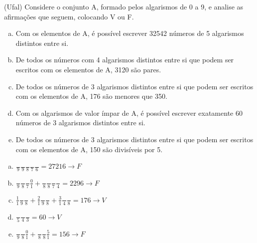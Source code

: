 \begin{ex}
(Ufal) Considere o conjunto A, formado pelos algarismos de 0 a 9, e analise as afirmações que seguem, colocando V ou F.
   \begin{enumerate}[(a)]
   \item Com os elementos de A, é possível escrever 32542 números de 5 algarismos distintos entre si.
   \item De todos os números com 4 algarismos distintos entre si que podem ser escritos com os elementos de A, 3120 são pares.
   \item De todos os números de 3 algarismos distintos entre si que podem ser escritos com os elementos de A, 176 são menores que 350.
   \item Com os algarismos de valor ímpar de A, é possível escrever exatamente 60 números de 3 algarismos distintos entre si. 
   \item De todos os números de 3 algarismos distintos entre si que podem ser escritos com os elementos de A, 150 são divisíveis por 5.
   \end{enumerate}
     \begin{sol}
      \phantom{A} 
      \begin{enumerate} [(a)]
          \item$ \frac{\phantom{A}}{9}\frac{\phantom{A}}{9}\frac{\phantom{A}}{8}\frac{\phantom{A}}{7}\frac{\phantom{A}}{6}= 27216 \rightarrow F$
          \item $\frac{\phantom{A}}{9}\frac{\phantom{A}}{8}\frac{\phantom{A}}{7}\frac{0}{1}+\frac{\phantom{A}}{8}\frac{\phantom{A}}{8}\frac{\phantom{A}}{7}\frac{\phantom{A}}{4}= 2296 \rightarrow F$
          \item $\frac{1}{1}\frac{\phantom{A}}{9}\frac{\phantom{A}}{8}+\frac{2}{1}\frac{\phantom{A}}{9}\frac{\phantom{A}}{8}+\frac{3}{1}\frac{\phantom{A}}{4}\frac{\phantom{A}}{8} = 176 \rightarrow V$
          \item $\frac{\phantom{A}}{5}\frac{\phantom{A}}{4}\frac{\phantom{A}}{3} = 60 \rightarrow V$
          \item $\frac{\phantom{A}}{9}\frac{\phantom{A}}{8}\frac{0}{1}+\frac{\phantom{A}}{8}\frac{\phantom{A}}{8}\frac{5}{1}= 156  \rightarrow F$
      \end{enumerate}
     \end{sol}
\end{ex}